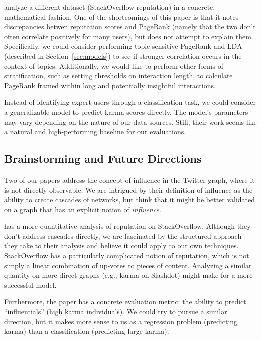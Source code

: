\documentclass[10pt]{article}
\begin{document}
\citet{movshovitzanalysis} analyze a different dataset (StackOverflow
reputation) in a concrete, mathematical fashion.  One of the shortcomings of
this paper is that it notes discrepancies betwen reputation scores and PageRank
(namely that the two don't often correlate positively for many users), but does
not attempt to explain them. Specifically, we could consider performing
topic-sensitive PageRank and LDA (described in Section~\ref{sec:models}) to see
if stronger correlation occurs in the context of topics.  Additionally, we would
like to perform other forms of stratification, such as setting thresholds on
interaction length, to calculate PageRank framed within long and potentially
insightful interactions.

Instead of identifying expert users through a classification task, we could
consider a generalizable model to predict karma scores directly. The model's
parameters may vary depending on the nature of our data sources. Still, their
work seems like a natural and high-performing baseline for our evaluations. 

\subsection{Brainstorming and Future Directions}

Two of our papers address the concept of influence in the Twitter graph, where
it is not directly observable. We are intrigued by their definition of influence
as the ability to create cascades of networks, but think that it might be better
validated on a graph that has an explicit notion of \textit{influence}.

\citet{movshovitzanalysis} has a more quantitative analysis of reputation on
StackOverflow.  Although they don't address cascades directly, we are fascinated 
by the structured approach they take to their analysis and believe it could apply
to our own techniques.  StackOverflow has a particularly complicated
notion of reputation, which is not simply a linear combination of up-votes to
pieces of content. Analyzing a similar quantity on more direct graphs (e.g.,
karma on Slashdot) might make for a more successful model.

Furthermore, the paper has a concrete evaluation metric: the ability to predict
``influentials'' (high karma individuals). We could try to pursue a similar
direction, but it makes more sense to us as a regression problem (predicting
karma) than a classification (predicting large karma).
\end{document}
